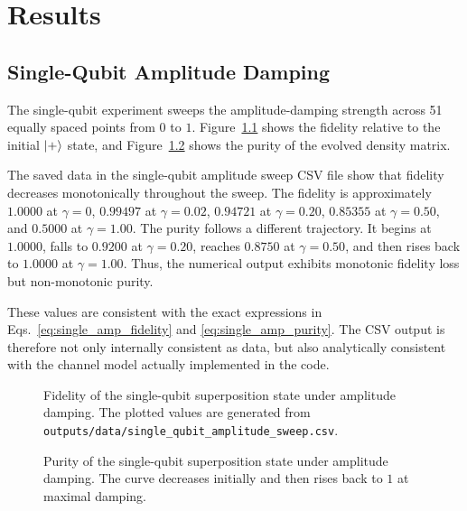 \chapter{Results}

\section{Single-Qubit Amplitude Damping}

The single-qubit experiment sweeps the amplitude-damping strength across 51 equally spaced points from $0$ to $1$. Figure~\ref{fig:single_fidelity} shows the fidelity relative to the initial $\lvert + \rangle$ state, and Figure~\ref{fig:single_purity} shows the purity of the evolved density matrix.

The saved data in the single-qubit amplitude sweep CSV file show that fidelity decreases monotonically throughout the sweep. The fidelity is approximately $1.0000$ at $\gamma=0$, $0.99497$ at $\gamma=0.02$, $0.94721$ at $\gamma=0.20$, $0.85355$ at $\gamma=0.50$, and $0.5000$ at $\gamma=1.00$. The purity follows a different trajectory. It begins at $1.0000$, falls to $0.9200$ at $\gamma=0.20$, reaches $0.8750$ at $\gamma=0.50$, and then rises back to $1.0000$ at $\gamma=1.00$. Thus, the numerical output exhibits monotonic fidelity loss but non-monotonic purity.

These values are consistent with the exact expressions in Eqs.~\eqref{eq:single_amp_fidelity} and \eqref{eq:single_amp_purity}. The CSV output is therefore not only internally consistent as data, but also analytically consistent with the channel model actually implemented in the code.

\begin{figure}[t]
\centering
{}
\caption{Fidelity of the single-qubit superposition state under amplitude damping. The plotted values are generated from \texttt{outputs/data/single\_qubit\_amplitude\_sweep.csv}.}
\label{fig:single_fidelity}
\end{figure}

\begin{figure}[t]
\centering
{}
\caption{Purity of the single-qubit superposition state under amplitude damping. The curve decreases initially and then rises back to $1$ at maximal damping.}
\label{fig:single_purity}
\end{figure}


